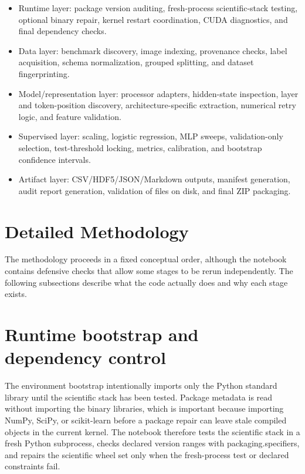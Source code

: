 \documentclass[11pt,a4paper]{article}
\begin{document}
\begin{itemize}

\item Runtime layer: package version auditing, fresh-process scientific-stack testing, optional binary repair, kernel restart coordination, CUDA diagnostics, and final dependency checks.

\item Data layer: benchmark discovery, image indexing, provenance checks, label acquisition, schema normalization, grouped splitting, and dataset fingerprinting.

\item Model/representation layer: processor adapters, hidden-state inspection, layer and token-position discovery, architecture-specific extraction, numerical retry logic, and feature validation.

\item Supervised layer: scaling, logistic regression, MLP sweeps, validation-only selection, test-threshold locking, metrics, calibration, and bootstrap confidence intervals.

\item Artifact layer: CSV/HDF5/JSON/Markdown outputs, manifest generation, audit report generation, validation of files on disk, and final ZIP packaging.

\end{itemize}

\section{Detailed Methodology}

The methodology proceeds in a fixed conceptual order, although the notebook contains defensive checks that allow some stages to be rerun independently. The following subsections describe what the code actually does and why each stage exists.

\section{Runtime bootstrap and dependency control}

The environment bootstrap intentionally imports only the Python standard library until the scientific stack has been tested. Package metadata is read without importing the binary libraries, which is important because importing NumPy, SciPy, or scikit-learn before a package repair can leave stale compiled objects in the current kernel. The notebook therefore tests the scientific stack in a fresh Python subprocess, checks declared version ranges with packaging.specifiers, and repairs the scientific wheel set only when the fresh-process test or declared constraints fail.
\end{document}
